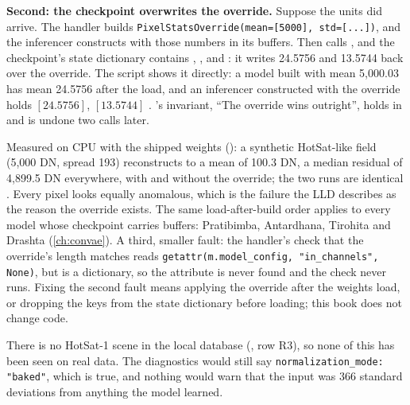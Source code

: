 \begin{sloppypar}\noindent\textbf{Second: the checkpoint overwrites the override.} Suppose the units did arrive. The handler builds
\lstinline!PixelStatsOverride(mean=[5000], std=[...])!, and the inferencer constructs  with those
numbers in its  buffers. Then  calls
, and the checkpoint's state dictionary contains
, ,  and : it writes 24.5756 and
13.5744 back over the override. The script shows it directly: a model built with mean 5,000.03 has mean 24.5756
after the load, and an inferencer constructed with the override holds $[24.5756]$, $[13.5744]$ \tagC.
's invariant, ``The override wins outright'', holds in  and
is undone two calls later.\end{sloppypar}

\begin{sourcenote}
Measured on CPU with the shipped weights (): a synthetic HotSat-like field
(5,000 DN, spread 193) reconstructs to a mean of 100.3 DN, a median residual of 4,899.5 DN everywhere, with and
without the override; the two runs are identical \tagC. Every pixel looks equally anomalous, which is the failure the
LLD describes as the reason the override exists. The same load-after-build order applies to every model whose
checkpoint carries  buffers: Pratibimba, Antardhana, Tirohita and Drashta (\cref{ch:convae}).
A third, smaller fault: the handler's check that the override's length matches  reads
\lstinline!getattr(m.model_config, "in_channels", None)!, but  is a dictionary, so the attribute is
never found and the check never runs. Fixing the second fault means applying the override after the weights load, or
dropping the  keys from the state dictionary before loading; this book does not change code.
\end{sourcenote}

There is no HotSat-1 scene in the local database (, row R3), so
none of this has been seen on real data. The diagnostics would still say \lstinline!normalization_mode: "baked"!, which is
true, and nothing would warn that the input was 366 standard deviations from anything the model learned.


